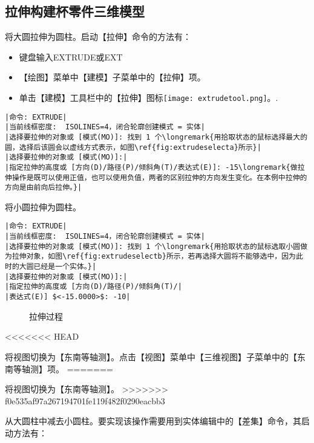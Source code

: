 \subsection{拉伸构建杯零件三维模型}
\begin{procedure}
\item 将大圆拉伸为圆柱。启动【拉伸】命令的方法有：
\begin{itemize}
\item 键盘输入EXTRUDE或EXT
\item 【绘图】菜单中【建模】子菜单中的【拉伸】项。
\item 单击【建模】工具栏中的【拉伸】图标\texttt{[image: extrudetool.png]}。.
\end{itemize}
\begin{lstlisting}
|命令: EXTRUDE|
|当前线框密度:  ISOLINES=4，闭合轮廓创建模式 = 实体|
|选择要拉伸的对象或 [模式(MO)]: 找到 1 个\longremark{用拾取状态的鼠标选择最大的圆，选择后该圆会以虚线方式表示，如图\ref{fig:extrudeselecta}所示}|
|选择要拉伸的对象或 [模式(MO)]:|
|指定拉伸的高度或 [方向(D)/路径(P)/倾斜角(T)/表达式(E)]: -15\longremark{做拉伸操作是既可以使用正值，也可以使用负值，两者的区别拉伸的方向发生变化。在本例中拉伸的方向是由前向后拉伸。}|
\end{lstlisting}
\item 将小圆拉伸为圆柱。
\begin{lstlisting}
|命令: EXTRUDE|
|当前线框密度:  ISOLINES=4，闭合轮廓创建模式 = 实体|
|选择要拉伸的对象或 [模式(MO)]: 找到 1 个\longremark{用拾取状态的鼠标选取小圆做为拉伸对象，如图\ref{fig:extrudeselectb}所示，若再选择大圆将不能够选中，因为此时的大圆已经是一个实体。}|
|选择要拉伸的对象或 [模式(MO)]:|
|指定拉伸的高度或 [方向(D)/路径(P)/倾斜角(T)/|
|表达式(E)] $<-15.0000>$: -10|
\end{lstlisting}
\begin{figure}[htbp]
\centering
{}\hspace{20pt}
\caption{拉伸过程}
\end{figure}
\showremarks
<<<<<<< HEAD
\item 将视图切换为【东南等轴测】。点击【视图】菜单中【三维视图】子菜单中的【东南等轴测】项。
=======
\item 将视图切换为【东南等轴测】。
>>>>>>> f0e535af97a267194701fe119f482f0290eacbb3
\item 从大圆柱中减去小圆柱。要实现该操作需要用到实体编辑中的【差集】命令，其启动方法有：

\end{procedure}
